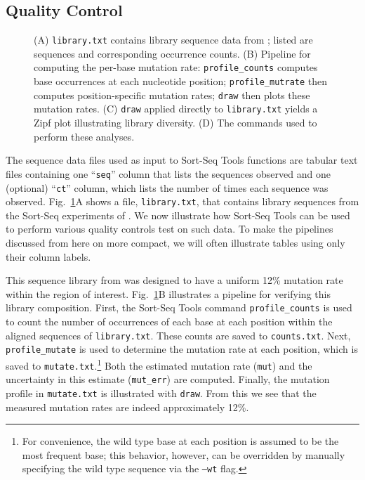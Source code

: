 \documentclass{bmcart}
\newcommand{\fig}[2]{Fig.\ \ref{#1}#2}
\begin{document}
%
%
\subsection*{Quality Control}

%
%
\begin{figure}[h!]
\caption{
(A) \texttt{library.txt} contains library sequence data from \cite{Kinney:2010tn}; listed are sequences and corresponding occurrence counts. (B) Pipeline for computing the per-base mutation rate: \texttt{profile\_counts} computes base occurrences at each nucleotide position; \texttt{profile\_mutrate} then computes position-specific mutation rates; \texttt{draw} then plots these mutation rates. (C) \texttt{draw} applied directly to \texttt{library.txt} yields a Zipf plot illustrating library diversity. (D) The commands used to perform these analyses. 
}
\label{fig:qc}
\end{figure}

The sequence data files used as input to Sort-Seq Tools functions are tabular text files containing one ``\texttt{seq}'' column that lists the sequences observed and one (optional) ``\texttt{ct}'' column, which lists the number of times each sequence was observed. \fig{fig:qc}{A} shows a file, \texttt{library.txt}, that contains library sequences from the Sort-Seq experiments of \cite{Kinney:2010tn}. We now illustrate how Sort-Seq Tools can be used to perform various quality controls test on such data. To make the pipelines discussed from here on more compact, we will often illustrate tables using only their column labels.

This sequence library from \cite{Kinney:2010tn} was designed to have a uniform 12\% mutation rate within the region of interest. \fig{fig:qc}{B} illustrates a pipeline for verifying this library composition.  First, the Sort-Seq Tools command \texttt{profile\_counts} is used to count the number of occurrences of each base at each position within the aligned sequences of \texttt{library.txt}. These counts are saved to \texttt{counts.txt}. Next, \texttt{profile\_mutate} is used to determine the mutation rate at each position, which is saved to \texttt{mutate.txt}.\footnote{For convenience, the wild type base at each position is assumed to be the most frequent base; this behavior, however, can be overridden by manually specifying the wild type sequence via the \texttt{--wt} flag.} Both the estimated mutation rate (\texttt{mut}) and the uncertainty in this estimate (\texttt{mut\_err}) are computed. Finally, the mutation profile in \texttt{mutate.txt} is illustrated with \texttt{draw}. From this we see that the measured mutation rates are indeed approximately 12\%. 
\end{document}
